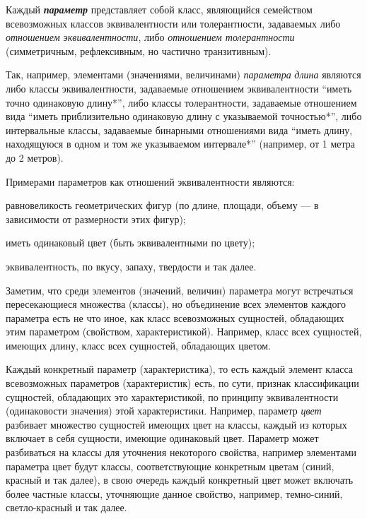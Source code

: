 Каждый \textbf{\textit{параметр}} представляет собой класс, являющийся семейством всевозможных классов эквивалентности или толерантности, задаваемых либо \textit{отношением эквивалентности}, либо \textit{отношением толерантности} (симметричным, рефлексивным, но частично транзитивным).

Так, например, элементами (значениями, величинами) \textit{параметра} \textit{длина} являются либо классы эквивалентности, задаваемые отношением эквивалентности ``иметь точно одинаковую длину*'', либо классы толерантности, задаваемые отношением вида ``иметь приблизительно одинаковую длину с указываемой точностью*'', либо интервальные классы, задаваемые бинарными отношениями вида ``иметь длину, находящуюся в одном и том же указываемом интервале*'' (например, от 1 метра до 2 метров).

Примерами параметров как отношений эквивалентности являются:

\begin{textitemize}
	\item равновеликость геометрических фигур (по длине, площади, объему --- в зависимости от размерности этих фигур);
	\item иметь одинаковый цвет (быть эквивалентными по цвету);
	\item эквивалентность, по вкусу, запаху, твердости и так далее.
\end{textitemize}

Заметим, что среди элементов (значений, величин) параметра могут встречаться пересекающиеся множества (классы), но объединение всех элементов каждого параметра есть не что иное, как класс всевозможных сущностей, обладающих этим параметром (свойством, характеристикой). Например, класс всех сущностей, имеющих длину, класс всех сущностей, обладающих цветом.

\begin{SCn}
\begin{scnsubdividing}
\end{scnsubdividing}
\end{SCn}
		
Каждый конкретный параметр (характеристика), то есть каждый элемент класса всевозможных параметров (характеристик) есть, по сути, признак классификации сущностей, обладающих это характеристикой, по принципу эквивалентности (одинаковости значения) этой характеристики. Например, параметр \textit{цвет} разбивает множество сущностей имеющих цвет на классы, каждый из которых включает в себя сущности, имеющие одинаковый цвет. Параметр может разбиваться на классы для уточнения некоторого свойства, например элементами параметра цвет будут классы, соответствующие конкретным цветам (синий, красный и так далее), в свою очередь каждый конкретный цвет может включать более частные классы, уточняющие данное свойство, например, темно-синий, светло-красный и так далее.
		
